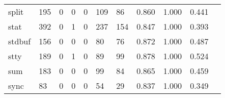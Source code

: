 \begin{longtable}{lp{1.2cm}p{1.2cm}p{1.2cm}p{1.2cm}p{1.2cm}p{1.2cm}p{1.2cm}p{1.2cm}p{1.2cm}p{1.2cm}}
split     &                                   195 &                                                  0 &                                                  0 &                                                  0 &                                                109 &                                                 86 &                                              0.860 &                                              1.000 &                                              0.441 \\
stat      &                                   392 &                                                  0 &                                                  1 &                                                  0 &                                                237 &                                                154 &                                              0.847 &                                              1.000 &                                              0.393 \\
stdbuf    &                                   156 &                                                  0 &                                                  0 &                                                  0 &                                                 80 &                                                 76 &                                              0.872 &                                              1.000 &                                              0.487 \\
stty      &                                   189 &                                                  0 &                                                  1 &                                                  0 &                                                 89 &                                                 99 &                                              0.878 &                                              1.000 &                                              0.524 \\
sum       &                                   183 &                                                  0 &                                                  0 &                                                  0 &                                                 99 &                                                 84 &                                              0.865 &                                              1.000 &                                              0.459 \\
sync      &                                    83 &                                                  0 &                                                  0 &                                                  0 &                                                 54 &                                                 29 &                                              0.837 &                                              1.000 &                                              0.349 \\

\end{longtable}
